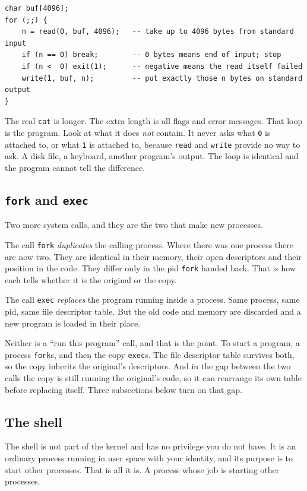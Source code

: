 \documentclass[11pt,a4paper]{article}
\begin{document}
\begin{lstlisting}[language=SH]
char buf[4096];
for (;;) {
    n = read(0, buf, 4096);   -- take up to 4096 bytes from standard input
    if (n == 0) break;        -- 0 bytes means end of input; stop
    if (n <  0) exit(1);      -- negative means the read itself failed
    write(1, buf, n);         -- put exactly those n bytes on standard output
}
\end{lstlisting}

The real \texttt{cat} is longer. The extra length is all flags and error messages. That loop is
the program. Look at what it does \emph{not} contain. It never asks what \texttt{0} is attached to,
or what \texttt{1} is attached to, because \texttt{read} and \texttt{write} provide no way to ask.
A disk file, a keyboard, another program's output. The loop is identical and the program cannot
tell the difference.

\subsection{\texttt{fork} and \texttt{exec}}

Two more system calls, and they are the two that make new processes.

The call \texttt{fork} \emph{duplicates} the calling process. Where there was one process there are now
two. They are identical in their memory, their open descriptors and their position in the code.
They differ only in the pid \texttt{fork} handed back. That is how each tells whether it is the
original or the copy.

The call \texttt{exec} \emph{replaces} the program running inside a process. Same process, same pid, same
file descriptor table. But the old code and memory are discarded and a new program is loaded in their
place.

Neither is a ``run this program'' call, and that is the point. To start a program, a process
\texttt{fork}s, and then the copy \texttt{exec}s. The file descriptor table survives both, so the copy
inherits the original's descriptors. And in the gap between the two calls the copy is still running
the original's code, so it can rearrange its own table before replacing itself. Three subsections
below turn on that gap.

\subsection{The shell}

The shell is not part of the kernel and has no privilege you do not have. It is an ordinary
process running in user space with your identity, and its purpose is to start other processes. That
is all it is. A process whose job is starting other processes.
\end{document}
